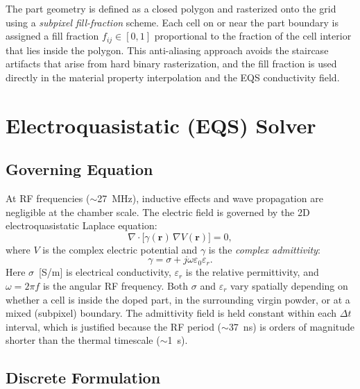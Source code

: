 \documentclass[11pt, letterpaper]{article}
\begin{document}
The part geometry is defined as a closed polygon and rasterized onto the grid
using a \emph{subpixel fill-fraction} scheme.
Each cell on or near the part boundary is assigned a fill fraction
$f_{ij}\in[0,1]$ proportional to the fraction of the cell interior that lies
inside the polygon.
This anti-aliasing approach avoids the staircase artifacts that arise from
hard binary rasterization, and the fill fraction is used directly in the
material property interpolation and the EQS conductivity field.

\section{Electroquasistatic (EQS) Solver}

\subsection{Governing Equation}

At RF frequencies ($\sim$27~MHz), inductive effects and wave propagation
are negligible at the chamber scale.
The electric field is governed by the 2D electroquasistatic Laplace equation:
%
\begin{equation}
  \label{eq:eqs}
  \nabla\cdot\bigl[\gamma(\bm{r})\,\nabla V(\bm{r})\bigr] = 0,
\end{equation}
%
where $V$ is the complex electric potential and $\gamma$ is the
\emph{complex admittivity}:
%
\begin{equation}
  \gamma = \sigma + j\omega\varepsilon_0\varepsilon_r.
\end{equation}
%
Here $\sigma$~[S/m] is electrical conductivity, $\varepsilon_r$ is the relative
permittivity, and $\omega = 2\pi f$ is the angular RF frequency.
Both $\sigma$ and $\varepsilon_r$ vary spatially depending on whether a cell
is inside the doped part, in the surrounding virgin powder, or at a mixed
(subpixel) boundary.
The admittivity field is held constant within each $\Delta t$ interval,
which is justified because the RF period ($\sim$37~ns) is orders of magnitude
shorter than the thermal timescale ($\sim$1~s).

\subsection{Discrete Formulation}
\end{document}
